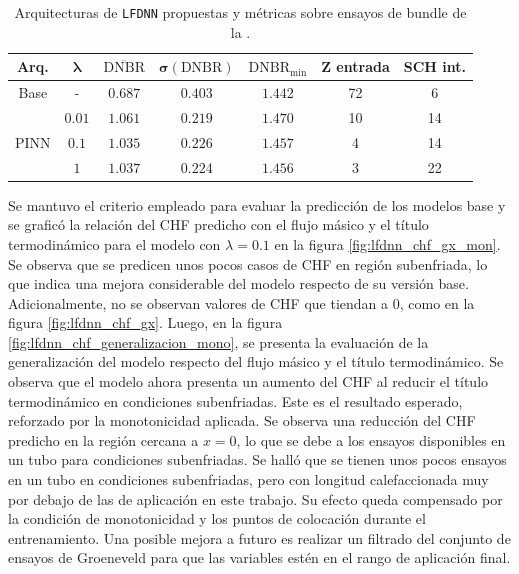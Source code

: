 \begin{table}[H]
	\centering
	\caption{Arquitecturas de \texttt{LFDNN} propuestas y métricas sobre ensayos de bundle de la \cna{}.}
	\begin{tabular}{c c c c c c c} 
        \toprule
        \textbf{Arq.} & $\bm{\lambda}$ & $\bm{\overline{\mathrm{DNBR}}}$ & $\bm{\sigma(\mathrm{DNBR})}$ &  $\bm{\mathrm{DNBR}_\mathrm{min}}$ & \textbf{Z entrada} & \textbf{SCH int.} \\ \hline
        Base    & -      & $0.687$ & $0.403$ & $1.442$ & 72 & 6  \\
        \multirow{3}{*}{PINN} 
                & $0.01$ & $1.061$ & $0.219$ & $1.470$ & 10 & 14 \\
                & $0.1$  & $1.035$ & $0.226$ & $1.457$ & 4  & 14 \\
                & $1$    & $1.037$ & $0.224$ & $1.456$ & 3  & 22 \\
		\bottomrule
	\end{tabular}
	\label{tab:lfdnn_dnbrmin_comp}
\end{table}

Se mantuvo el criterio empleado para evaluar la predicción de los modelos base y se graficó la relación del CHF predicho con el flujo másico y el título termodinámico para el modelo \lfpinn{} con $\lambda=0.1$ en la figura \ref{fig:lfdnn_chf_gx_mon}. Se observa que se predicen unos pocos casos de CHF en región subenfriada, lo que indica una mejora considerable del modelo respecto de su versión base. Adicionalmente, no se observan valores de CHF que tiendan a $0$, como en la figura \ref{fig:lfdnn_chf_gx}.
Luego, en la figura \ref{fig:lfdnn_chf_generalizacion_mono}, se presenta la evaluación de la generalización del modelo respecto del flujo másico y el título termodinámico. Se observa que el modelo ahora presenta un aumento del CHF al reducir el título termodinámico en condiciones subenfriadas. Este es el resultado esperado, reforzado por la monotonicidad aplicada. Se observa una reducción del CHF predicho en la región cercana a $x=0$, lo que se debe a los ensayos disponibles en un tubo para condiciones subenfriadas. Se halló que se tienen unos pocos ensayos en un tubo en condiciones subenfriadas, pero con longitud calefaccionada muy por debajo de las de aplicación en este trabajo. Su efecto queda compensado por la condición de monotonicidad y los puntos de colocación durante el entrenamiento. Una posible mejora a futuro es realizar un filtrado del conjunto de ensayos de Groeneveld para que las variables estén en el rango de aplicación final.

